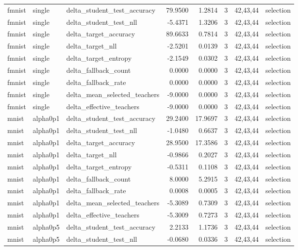 \begin{tabular}{lllrrrll}
fmnist & single & delta\_student\_test\_accuracy & 79.9500 & 1.2814 & 3 & 42,43,44 & selection \\
fmnist & single & delta\_student\_test\_nll & -5.4371 & 1.3206 & 3 & 42,43,44 & selection \\
fmnist & single & delta\_target\_accuracy & 89.6633 & 0.7814 & 3 & 42,43,44 & selection \\
fmnist & single & delta\_target\_nll & -2.5201 & 0.0139 & 3 & 42,43,44 & selection \\
fmnist & single & delta\_target\_entropy & -2.1549 & 0.0302 & 3 & 42,43,44 & selection \\
fmnist & single & delta\_fallback\_count & 0.0000 & 0.0000 & 3 & 42,43,44 & selection \\
fmnist & single & delta\_fallback\_rate & 0.0000 & 0.0000 & 3 & 42,43,44 & selection \\
fmnist & single & delta\_mean\_selected\_teachers & -9.0000 & 0.0000 & 3 & 42,43,44 & selection \\
fmnist & single & delta\_effective\_teachers & -9.0000 & 0.0000 & 3 & 42,43,44 & selection \\
mnist & alpha0p1 & delta\_student\_test\_accuracy & 29.2400 & 17.9697 & 3 & 42,43,44 & selection \\
mnist & alpha0p1 & delta\_student\_test\_nll & -1.0480 & 0.6637 & 3 & 42,43,44 & selection \\
mnist & alpha0p1 & delta\_target\_accuracy & 28.9500 & 17.3586 & 3 & 42,43,44 & selection \\
mnist & alpha0p1 & delta\_target\_nll & -0.9866 & 0.2027 & 3 & 42,43,44 & selection \\
mnist & alpha0p1 & delta\_target\_entropy & -0.5311 & 0.1108 & 3 & 42,43,44 & selection \\
mnist & alpha0p1 & delta\_fallback\_count & 8.0000 & 5.2915 & 3 & 42,43,44 & selection \\
mnist & alpha0p1 & delta\_fallback\_rate & 0.0008 & 0.0005 & 3 & 42,43,44 & selection \\
mnist & alpha0p1 & delta\_mean\_selected\_teachers & -5.3089 & 0.7309 & 3 & 42,43,44 & selection \\
mnist & alpha0p1 & delta\_effective\_teachers & -5.3009 & 0.7273 & 3 & 42,43,44 & selection \\
mnist & alpha0p5 & delta\_student\_test\_accuracy & 2.2133 & 1.1736 & 3 & 42,43,44 & selection \\
mnist & alpha0p5 & delta\_student\_test\_nll & -0.0680 & 0.0336 & 3 & 42,43,44 & selection \\

\end{tabular}
